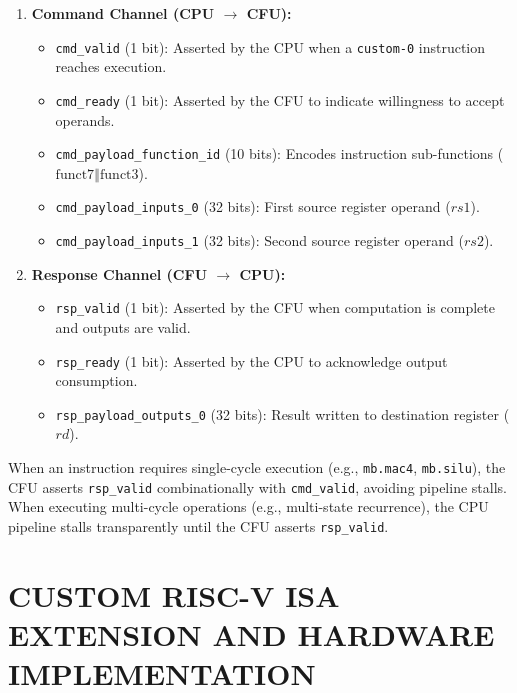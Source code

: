 \documentclass[11pt,a4paper,oneside]{report}
\begin{document}
\begin{enumerate}
    \item \textbf{Command Channel (CPU $\to$ CFU):}
    \begin{itemize}
        \item \texttt{cmd\_valid} (1 bit): Asserted by the CPU when a \texttt{custom-0} instruction reaches execution.
        \item \texttt{cmd\_ready} (1 bit): Asserted by the CFU to indicate willingness to accept operands.
        \item \texttt{cmd\_payload\_function\_id} (10 bits): Encodes instruction sub-functions ($\text{funct7} \mathbin{\Vert} \text{funct3}$).
        \item \texttt{cmd\_payload\_inputs\_0} (32 bits): First source register operand ($rs1$).
        \item \texttt{cmd\_payload\_inputs\_1} (32 bits): Second source register operand ($rs2$).
    \end{itemize}
    \item \textbf{Response Channel (CFU $\to$ CPU):}
    \begin{itemize}
        \item \texttt{rsp\_valid} (1 bit): Asserted by the CFU when computation is complete and outputs are valid.
        \item \texttt{rsp\_ready} (1 bit): Asserted by the CPU to acknowledge output consumption.
        \item \texttt{rsp\_payload\_outputs\_0} (32 bits): Result written to destination register ($rd$).
    \end{itemize}
\end{enumerate}

When an instruction requires single-cycle execution (e.g., \texttt{mb.mac4}, \texttt{mb.silu}), the CFU asserts \texttt{rsp\_valid} combinationally with \texttt{cmd\_valid}, avoiding pipeline stalls. When executing multi-cycle operations (e.g., multi-state recurrence), the CPU pipeline stalls transparently until the CFU asserts \texttt{rsp\_valid}.

\chapter{CUSTOM RISC-V ISA EXTENSION AND HARDWARE IMPLEMENTATION}
\label{Chapter4}
\rhead{}
\end{document}
